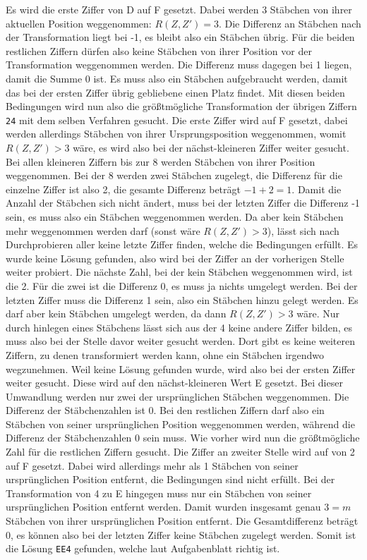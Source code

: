 \documentclass[a4paper,10pt,ngerman]{scrartcl}
\begin{document}
Es wird die erste Ziffer von D auf F gesetzt. Dabei werden 3 Stäbchen von ihrer aktuellen Position weggenommen: $R(Z, Z')=3$. Die Differenz an Stäbchen nach der Transformation liegt bei -1, es bleibt also ein Stäbchen übrig. Für die beiden restlichen Ziffern dürfen also keine Stäbchen von ihrer Position vor der Transformation weggenommen werden. Die Differenz muss dagegen bei 1 liegen, damit die Summe $0$ ist. Es muss also ein Stäbchen aufgebraucht werden, damit das bei der ersten Ziffer übrig gebliebene einen Platz findet. Mit diesen beiden Bedingungen wird nun also die größtmögliche Transformation der übrigen Ziffern \lstinline|24| mit dem selben Verfahren gesucht. Die erste Ziffer wird auf F gesetzt, dabei werden allerdings Stäbchen von ihrer Ursprungsposition weggenommen, womit $R(Z, Z') > 3$ wäre, es wird also bei der nächst-kleineren Ziffer weiter gesucht. Bei allen kleineren Ziffern bis zur 8 werden Stäbchen von ihrer Position weggenommen. Bei der 8 werden zwei Stäbchen zugelegt, die Differenz für die einzelne Ziffer ist also 2, die gesamte Differenz beträgt $-1 + 2 = 1$. Damit die Anzahl der Stäbchen sich nicht ändert, muss bei der letzten Ziffer die Differenz -1 sein, es muss also ein Stäbchen weggenommen werden. Da aber kein Stäbchen mehr weggenommen werden darf (sonst wäre $R(Z, Z') > 3$), lässt sich nach Durchprobieren aller keine letzte Ziffer finden, welche die Bedingungen erfüllt. Es wurde keine Lösung gefunden, also wird bei der Ziffer an der vorherigen Stelle weiter probiert. Die nächste Zahl, bei der kein Stäbchen weggenommen wird, ist die 2. Für die zwei ist die Differenz 0, es muss ja nichts umgelegt werden. Bei der letzten Ziffer muss die Differenz 1 sein, also ein Stäbchen hinzu gelegt werden. Es darf aber kein Stäbchen umgelegt werden, da dann $R(Z, Z') > 3$ wäre. Nur durch hinlegen eines Stäbchens lässt sich aus der 4 keine andere Ziffer bilden, es muss also bei der Stelle davor weiter gesucht werden. Dort gibt es keine weiteren Ziffern, zu denen transformiert werden kann, ohne ein Stäbchen irgendwo wegzunehmen. Weil keine Lösung gefunden wurde, wird also bei der ersten Ziffer weiter gesucht. Diese wird auf den nächst-kleineren Wert E gesetzt. Bei dieser Umwandlung werden nur zwei der ursprünglichen Stäbchen weggenommen. Die Differenz der Stäbchenzahlen ist 0. Bei den restlichen Ziffern darf also ein Stäbchen von seiner ursprünglichen Position weggenommen werden, während die Differenz der Stäbchenzahlen 0 sein muss. Wie vorher wird nun die größtmögliche Zahl für die restlichen Ziffern gesucht. Die Ziffer an zweiter Stelle wird auf von 2 auf F gesetzt. Dabei wird allerdings mehr als 1 Stäbchen von seiner ursprünglichen Position entfernt, die Bedingungen sind nicht erfüllt. Bei der Transformation von 4 zu E hingegen muss nur ein Stäbchen von seiner ursprünglichen Position entfernt werden. Damit wurden insgesamt genau $3=m$ Stäbchen von ihrer ursprünglichen Position entfernt. Die Gesamtdifferenz beträgt 0, es können also bei der letzten Ziffer keine Stäbchen zugelegt werden. Somit ist die Lösung \lstinline|EE4| gefunden, welche laut Aufgabenblatt richtig ist. \\
\end{document}
